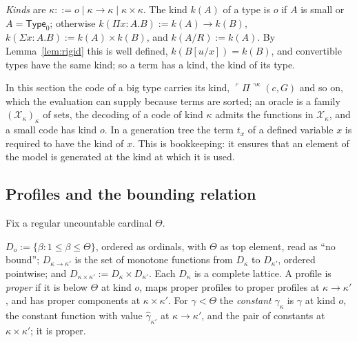 \documentclass[10pt]{article}
\newcommand{\Type}{\mathsf{Type}}
\newcommand{\code}[1]{\ulcorner #1\urcorner}
\newcommand{\X}{\mathcal{X}}
\begin{document}
\begin{definition}[kinds]\label{def:kinds}
\emph{Kinds} are $\kappa::=o\mid\kappa\to\kappa\mid\kappa\times\kappa$. The kind
$k(A)$ of a type is $o$ if $A$ is small or $A=\Type_0$; otherwise
$k(\Pi x{:}A.B):=k(A)\to k(B)$, $k(\Sigma x{:}A.B):=k(A)\times k(B)$, and
$k(A/R):=k(A)$. By Lemma~\ref{lem:rigid} this is well defined,
$k(B[u/x])=k(B)$, and convertible types have the same kind; so a term
has a kind, the kind of its type.
\end{definition}

In this section the code of a big type carries its kind,
$\code\Pi^\kappa(c,G)$ and so on, which the evaluation can supply because
terms are sorted; an oracle is a family $(\X_\kappa)_\kappa$ of sets, the
decoding of a code of kind $\kappa$ admits the functions in $\X_\kappa$, and
a small code has kind $o$. In a generation tree the term $t_x$ of a
defined variable $x$ is required to have the kind of $x$. This is
bookkeeping: it ensures that an element of the model is generated at
the kind at which it is used.

\subsection{Profiles and the bounding relation}

Fix a regular uncountable cardinal $\Theta$.

\begin{definition}[profiles]\label{def:profiles}
$D_o:=\{\beta:1\le\beta\le\Theta\}$, ordered as ordinals, with $\Theta$
as top element, read as ``no bound''; $D_{\kappa\to\kappa'}$ is the set of
monotone functions from $D_\kappa$ to $D_{\kappa'}$, ordered pointwise; and
$D_{\kappa\times\kappa'}:=D_\kappa\times D_{\kappa'}$. Each $D_\kappa$ is a complete
lattice. A profile is \emph{proper} if it is below $\Theta$ at kind $o$,
maps proper profiles to proper profiles at $\kappa\to\kappa'$, and has
proper components at $\kappa\times\kappa'$. For $\gamma<\Theta$ the
\emph{constant} $\hat\gamma_\kappa$ is $\gamma$ at kind $o$, the constant
function with value $\hat\gamma_{\kappa'}$ at $\kappa\to\kappa'$, and the pair
of constants at $\kappa\times\kappa'$; it is proper.
\end{definition}
\end{document}
